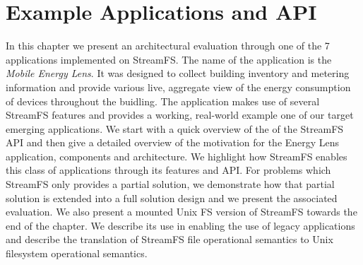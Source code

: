 \chapter{Example Applications and API}
\label{chap:ArchEvalMain}

In this chapter we present an architectural evaluation through one of the 7 applications implemented on StreamFS.
The name of the application is the \emph{Mobile Energy Lens}.  It was designed to collect building inventory and metering
information and provide various live, aggregate view of the energy consumption of devices throughout the buidling.
The application makes use of several StreamFS features and provides a working, real-world example one of our target
emerging applications.
We start with a quick overview of the of the StreamFS API and then give a detailed overview of the motivation for
the Energy Lens application, components and architecture.  We highlight how StreamFS enables this class of applications
through its features and API.  For problems which StreamFS only provides a partial solution, we demonstrate how that partial
solution is extended into a full solution design and we present the associated evaluation.
We also present a mounted Unix FS version of StreamFS towards the end of the chapter.  We describe its use in enabling 
the use of legacy applications and describe the translation of StreamFS file operational semantics to Unix filesystem
operational semantics.


% 

% 





